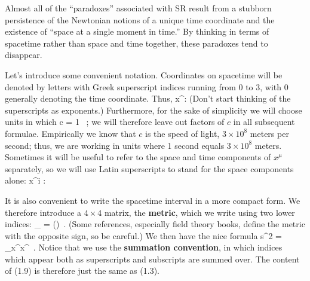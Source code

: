 Almost all of the ``paradoxes'' associated with SR result from a stubborn
persistence of the Newtonian notions of a unique time coordinate and the
existence of ``space at a single moment in time.''
By thinking in terms of spacetime rather than space and time together,
these paradoxes tend to disappear.

Let's introduce some convenient notation.  Coordinates on spacetime will
be denoted by letters with Greek superscript indices running from $0$ to
$3$, with $0$ generally denoting the time coordinate.  Thus,
\be
  x^\mu :\quad {}
  \label{1.5}
\ee
(Don't start thinking of the superscripts as exponents.)  Furthermore, for
the sake of simplicity we will choose units in which
\be
  c = 1 \ ;\label{1.6}
\ee
we will therefore leave out factors of $c$ in all subsequent formulae.
Empirically we know that $c$ is the speed of light, $3\times 10^8$ meters
per second; thus, we are working in units where 1 second equals $3\times 10^8$ 
meters.  Sometimes it will be useful to refer to the space and time 
components of $x^\mu$ separately, so we will use Latin superscripts to
stand for the space components alone:
\be
  x^i :\quad {}\label{1.7}
\ee

It is also convenient to write the spacetime interval in a more compact
form.  We therefore introduce a $4\times 4$ matrix, the
{\bf metric}, which we write using two lower indices: 
\be
  \eta_{\mn} = \left(\right)\ .\label{1.8}
\ee
(Some references, especially field theory books, define the metric with
the opposite sign, so be careful.)  We then have the nice formula
\be
  s^2 = \eta_\mn \Delta x^\mu \Delta x^\nu\ . \label{1.9}
\ee
Notice that we use the {\bf summation convention}, in which indices which
appear both as superscripts and subscripts are summed over.  The content
of (1.9) is therefore just the same as (1.3).

